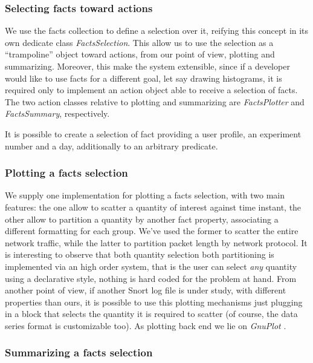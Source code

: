 \documentclass[10pt,a4paper]{article}
\begin{document}
    \subsubsection{Selecting facts toward actions}
    
    We use the facts collection to define a selection over it,
    reifying this concept in its own dedicate class
    \emph{FactsSelection}. This allow us to use the selection as a
    ``trampoline'' object \cite{weiher-ducasse} toward actions, from
    our point of view, plotting and summarizing. Moreover, this make
    the system extensible, since if a developer would like to use
    facts for a different goal, let say drawing histograms, it is
    required only to implement an action object able to receive a
    selection of facts. The two action classes relative to plotting
    and summarizing are \emph{FactsPlotter} and \emph{FactsSummary},
    respectively.

    It is possible to create a selection of fact providing a user
    profile, an experiment number and a day, additionally to an
    arbitrary predicate.

    \subsubsection{Plotting a facts selection}

    We supply one implementation for plotting a facts selection, with
    two main features: the one allow to scatter a quantity of interest
    against time instant, the other allow to partition a quantity by
    another fact property, associating a different formatting for each
    group. We've used the former to scatter the entire network
    traffic, while the latter to partition packet length by network
    protocol. It is interesting to observe that both quantity
    selection both partitioning is implemented via an high order
    system, that is the user can select \emph{any} quantity using a
    declarative style, nothing is hard coded for the problem at
    hand. From another point of view, if another Snort log file is
    under study, with different properties than ours, it is possible
    to use this plotting mechanisms just plugging in a block that
    selects the quantity it is required to scatter (of course, the
    data series format is customizable too). As plotting back end we
    lie on \emph{GnuPlot} \cite{gnuplot}.

    \subsubsection{Summarizing a facts selection}
\end{document}
